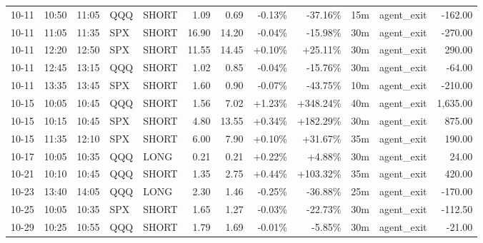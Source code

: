 \documentclass[11pt,a4paper,twoside]{article}
\begin{document}
\begin{center}
\begin{longtable}{>{\color{txtmain}}l l l l l r r r r r >{\color{txtmain}}l r}
10-11 & 10:50 & 11:05 & QQQ & SHORT & 1.09 & 0.69 & \textcolor{lossred}{-0.13\%} & \textcolor{lossred}{-37.16\%} & 15m & agent\_exit & \textcolor{lossred}{-162.00} \\
10-11 & 11:05 & 11:35 & SPX & SHORT & 16.90 & 14.20 & \textcolor{lossred}{-0.04\%} & \textcolor{lossred}{-15.98\%} & 30m & agent\_exit & \textcolor{lossred}{-270.00} \\
10-11 & 12:20 & 12:50 & SPX & SHORT & 11.55 & 14.45 & \textcolor{wingreen}{+0.10\%} & \textcolor{wingreen}{+25.11\%} & 30m & agent\_exit & \textcolor{wingreen}{290.00} \\
10-11 & 12:45 & 13:15 & QQQ & SHORT & 1.02 & 0.85 & \textcolor{lossred}{-0.04\%} & \textcolor{lossred}{-15.76\%} & 30m & agent\_exit & \textcolor{lossred}{-64.00} \\
10-11 & 13:35 & 13:45 & SPX & SHORT & 1.60 & 0.90 & \textcolor{lossred}{-0.07\%} & \textcolor{lossred}{-43.75\%} & 10m & agent\_exit & \textcolor{lossred}{-210.00} \\
10-15 & 10:05 & 10:45 & QQQ & SHORT & 1.56 & 7.02 & \textcolor{wingreen}{+1.23\%} & \textcolor{wingreen}{+348.24\%} & 40m & agent\_exit & \textcolor{wingreen}{1,635.00} \\
10-15 & 10:15 & 10:45 & SPX & SHORT & 4.80 & 13.55 & \textcolor{wingreen}{+0.34\%} & \textcolor{wingreen}{+182.29\%} & 30m & agent\_exit & \textcolor{wingreen}{875.00} \\
10-15 & 11:35 & 12:10 & SPX & SHORT & 6.00 & 7.90 & \textcolor{wingreen}{+0.10\%} & \textcolor{wingreen}{+31.67\%} & 35m & agent\_exit & \textcolor{wingreen}{190.00} \\
10-17 & 10:05 & 10:35 & QQQ & LONG & 0.21 & 0.21 & \textcolor{wingreen}{+0.22\%} & \textcolor{wingreen}{+4.88\%} & 30m & agent\_exit & \textcolor{wingreen}{24.00} \\
10-21 & 10:10 & 10:45 & QQQ & SHORT & 1.35 & 2.75 & \textcolor{wingreen}{+0.44\%} & \textcolor{wingreen}{+103.32\%} & 35m & agent\_exit & \textcolor{wingreen}{420.00} \\
10-23 & 13:40 & 14:05 & QQQ & LONG & 2.30 & 1.46 & \textcolor{lossred}{-0.25\%} & \textcolor{lossred}{-36.88\%} & 25m & agent\_exit & \textcolor{lossred}{-170.00} \\
10-25 & 10:05 & 10:35 & SPX & SHORT & 1.65 & 1.27 & \textcolor{lossred}{-0.03\%} & \textcolor{lossred}{-22.73\%} & 30m & agent\_exit & \textcolor{lossred}{-112.50} \\
10-29 & 10:25 & 10:55 & QQQ & SHORT & 1.79 & 1.69 & \textcolor{lossred}{-0.01\%} & \textcolor{lossred}{-5.85\%} & 30m & agent\_exit & \textcolor{lossred}{-21.00} \\

\end{longtable}
\end{center}
\end{document}
